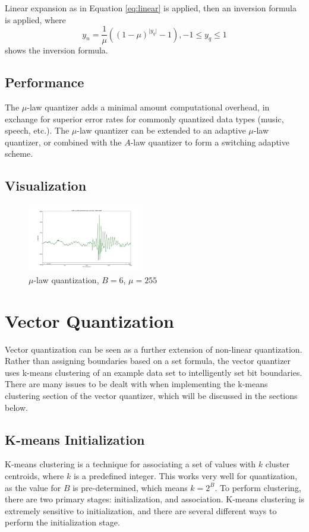 \documentclass[journal]{IEEEtran}
\begin{document}
Linear expansion as in Equation \ref{eq:linear} is applied, then an inversion formula is applied, where  
\begin{equation}
    y_n = \frac{1}{\mu}((1-\mu)^{\lvert y_q \rvert}-1), -1 \le y_q \le 1
\end{equation}
shows the inversion formula.

\subsection{Performance}
The $\mu$-law quantizer adds a minimal amount computational overhead, in exchange for superior error rates for commonly quantized data types
(music, speech, etc.). The $\mu$-law quantizer can be extended to an adaptive $\mu$-law quantizer, or combined with the $A$-law quantizer to
form a switching adaptive scheme.

\subsection{Visualization}
\begin{figure}[h!]
\centering
  \includegraphics[width=0.45\textwidth]{mu_6bit.png}
\caption{$\mu$-law quantization, $B = 6$, $\mu = 255$}
\label{fig:linear}
\end{figure}

\section{Vector Quantization}
Vector quantization can be seen as a further extension of non-linear quantization. Rather than assigning boundaries based on a set formula, the 
vector quantizer uses k-means clustering of an example data set to intelligently set bit boundaries. There are many issues to be dealt with 
when implementing the k-means clustering section of the vector quantizer, which will be discussed in the sections below.

\subsection{K-means Initialization}
K-means clustering is a technique for associating a set of values with $k$ cluster centroids, where $k$ is a predefined integer. This works very well for 
quantization, as the value for $B$ is pre-determined, which means $k = 2^B$. To perform clustering, there are two primary stages: initialization, 
and association. K-means clustering is extremely sensitive to initialization, and there are several different ways to perform the initialization stage. 
\end{document}
